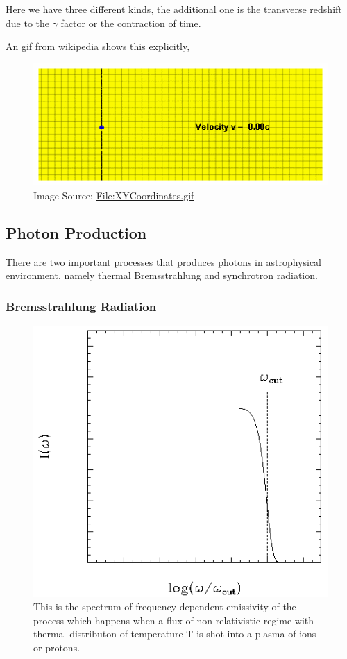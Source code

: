 \documentclass[letterpaper,10pt,english]{sphinxmanual}
\begin{document}
Here we have three different kinds, the additional one is the transverse redshift due to the \(\gamma\) factor or the contraction of time.

An gif from wikipedia shows this explicitly,
\begin{figure}[htbp]
\centering
\capstart

\includegraphics{XYCoordinates.gif}
\caption{Image Source: \href{https://en.wikipedia.org/wiki/File:XYCoordinates.gif}{File:XYCoordinates.gif}}\end{figure}


\subsection{Photon Production}
\label{astrophysics:photon-production}
There are two important processes that produces photons in astrophysical environment, namely thermal Bremsstrahlung and synchrotron radiation.


\subsubsection{Bremsstrahlung Radiation}
\label{astrophysics:bremsstrahlung-radiation}\begin{figure}[htbp]
\centering
\capstart

\includegraphics{thermalBremsstrahlungSpectrum.png}
\caption{This is the spectrum of frequency-dependent emissivity of the process which happens when a flux of non-relativistic regime with thermal distributon of temperature T is shot into a plasma of ions or protons.}\end{figure}
\end{document}
